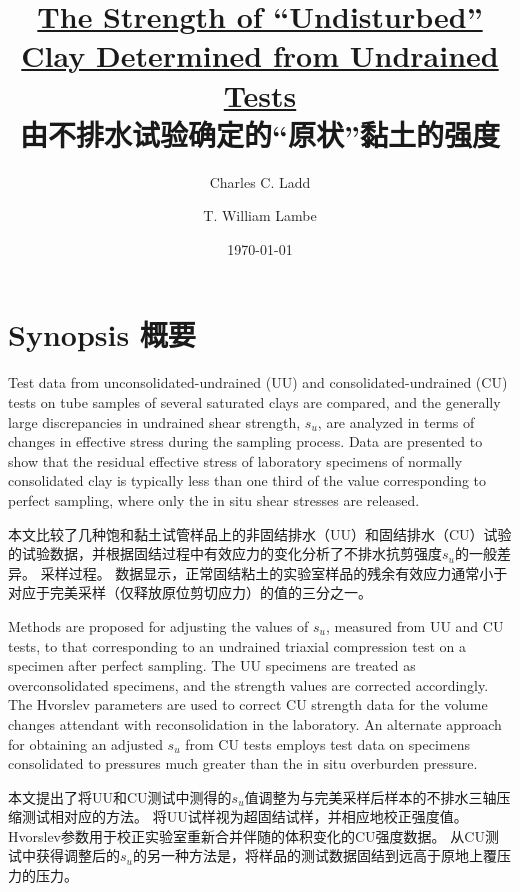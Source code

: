 \documentclass{myarticle}
\title{\textbf{\href{http://dx.doi.org/10.1520/STP30011S}{The Strength of “Undisturbed” Clay Determined from Undrained Tests}\\由不排水试验确定的“原状”黏土的强度}}
\date{\today}
\author{Charles C. Ladd \and T. William Lambe}
\begin{document}
\maketitle

\section*{Synopsis 概要}

\begin{paracol}{2}

    Test data from unconsolidated-undrained (UU) and consolidated-undrained (CU) tests on tube samples of several saturated clays are compared, and the generally large discrepancies in undrained shear strength, $s_u$, are analyzed in terms of changes in effective stress during the sampling process. Data are presented to show that the residual effective stress of laboratory specimens of normally consolidated clay is typically less than one third of the value corresponding to perfect sampling, where only the in situ shear stresses are released.
    
    \switchcolumn

    本文比较了几种饱和黏土试管样品上的非固结排水（UU）和固结排水（CU）试验的试验数据，并根据固结过程中有效应力的变化分析了不排水抗剪强度$s_u$的一般差异。 采样过程。 数据显示，正常固结粘土的实验室样品的残余有效应力通常小于对应于完美采样（仅释放原位剪切应力）的值的三分之一。

    \switchcolumn*

    Methods are proposed for adjusting the values of $s_u$, measured from UU and CU tests, to that corresponding to an undrained triaxial compression test on a specimen after perfect sampling. The UU specimens are treated as overconsolidated specimens, and the strength values are corrected accordingly. The Hvorslev parameters are used to correct CU strength data for the volume changes attendant with reconsolidation in the laboratory. An alternate approach for obtaining an adjusted $s_u$ from CU tests employs test data on specimens consolidated to pressures much greater than the in situ overburden pressure.

    \switchcolumn
        
    本文提出了将UU和CU测试中测得的$s_u$值调整为与完美采样后样本的不排水三轴压缩测试相对应的方法。 将UU试样视为超固结试样，并相应地校正强度值。Hvorslev参数用于校正实验室重新合并伴随的体积变化的CU强度数据。 从CU测试中获得调整后的$s_u$的另一种方法是，将样品的测试数据固结到远高于原地上覆压力的压力。


\end{paracol}
\end{document}
